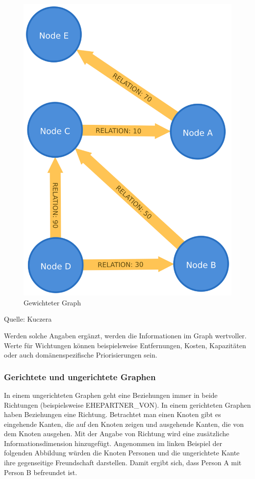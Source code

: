\documentclass[12pt,ngerman,]{article}
\begin{document}
\begin{figure}
\centering
\includegraphics{Bilder/weightedGraph.png}
\caption{Gewichteter Graph}
\end{figure}

Quelle: Kuczera

Werden solche Angaben ergänzt, werden die Informationen im Graph
wertvoller. Werte für Wichtungen können beispielsweise Entfernungen,
Kosten, Kapazitäten oder auch domänenspezifische Priorisierungen sein.

\subsubsection{Gerichtete und ungerichtete
Graphen}\label{gerichtete-und-ungerichtete-graphen}

In einem ungerichteten Graphen geht eine Beziehungen immer in beide
Richtungen (beispielsweise EHEPARTNER\_VON). In einem gerichteten
Graphen haben Beziehungen eine Richtung. Betrachtet man einen Knoten
gibt es eingehende Kanten, die auf den Knoten zeigen und ausgehende
Kanten, die von dem Knoten ausgehen. Mit der Angabe von Richtung wird
eine zusätzliche Informationsdimension hinzugefügt. Angenommen im linken
Beispiel der folgenden Abbildung würden die Knoten Personen und die
ungerichtete Kante ihre gegenseitige Freundschaft darstellen. Damit
ergibt sich, dass Person A mit Person B befreundet ist.
\end{document}

